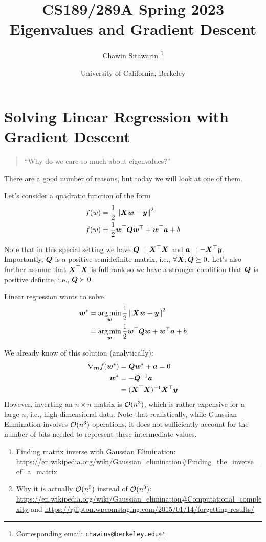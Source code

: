 \documentclass{article}
\title{CS189/289A Spring 2023\\Eigenvalues and Gradient Descent}
\author{
    Chawin Sitawarin \thanks{Corresponding email: \texttt{chawins@berkeley.edu}}
}
\date{
    University of California, Berkeley
}
\theoremstyle{plain}
\theoremstyle{definition}
\theoremstyle{remark}
\newcommand{\norm}[1]{\left\lVert#1\right\rVert}
\begin{document}
\maketitle


\section{Solving Linear Regression with Gradient Descent}

\begin{quote}
    ``Why do we care so much about eigenvalues?''
\end{quote}

There are a good number of reasons, but today we will look at one of them.

Let's consider a quadratic function of the form
\begin{align}
    f(w) & = \frac{1}{2} \norm{\mX \vw - \vy}^2          \\
    f(w) & = \frac{1}{2} \vw\T \mQ \vw\T + \vw\T \va + b
\end{align}

Note that in this special setting we have ${\bm{Q}} = {\bm{X}}{^{\top}} {\bm{X}}$ and ${\bm{a}} = -{\bm{X}}{^{\top}} {\bm{y}}$.
%
Importantly, ${\bm{Q}}$ is a positive semidefinite matrix, i.e., $\forall {\bm{X}}, {\bm{Q}} \succeq 0$.
%
Let's also further assume that ${\bm{X}}{^{\top}} {\bm{X}}$ is full rank so we have a stronger condition that ${\bm{Q}}$ is positive definite, i.e., ${\bm{Q}} \succ 0$.

Linear regression wants to solve
\begin{align}
    \vw^* & = \argmin_{\vw} \frac{1}{2} \norm{\mX \vw - \vy}^2        \\
          & = \argmin_{\vw} \frac{1}{2} \vw\T \mQ \vw + \vw\T \va + b
\end{align}

We already know of this solution (analytically):
\begin{align}
    \nabla_{\bm{m}} f({\bm{w}}^*) & = {\bm{Q}} {\bm{w}}^* + {\bm{a}} = 0        \\
    {\bm{w}}^*               & = -{\bm{Q}}^{-1} {\bm{a}}              \\
                        & = ({\bm{X}}{^{\top}} {\bm{X}})^{-1} {\bm{X}}{^{\top}} {\bm{y}}
\end{align}
However, inverting an $n \times n$ matrix is ${\mathcal{O}}(n^3)$, which is rather expensive for a large $n$, i.e., high-dimensional data.
%
Note that realistically, while Guassian Elimination involves ${\mathcal{O}}(n^3)$ operations, it does not sufficiently account for the number of bits needed to represent these intermediate values.
\begin{enumerate}
    \item Finding matrix inverse with Gaussian Elimination: \url{https://en.wikipedia.org/wiki/Gaussian_elimination#Finding_the_inverse_of_a_matrix}
    \item Why it is actually ${\mathcal{O}}({n^5})$ instead of ${\mathcal{O}}({n^3})$: \url{https://en.wikipedia.org/wiki/Gaussian_elimination#Computational_complexity} and \url{https://rjlipton.wpcomstaging.com/2015/01/14/forgetting-results/}
\end{enumerate}
\end{document}
